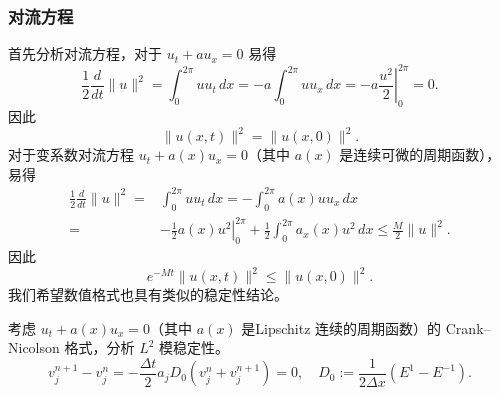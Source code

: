 \subsubsection{对流方程}

首先分析对流方程，对于 $u_t + a u_x = 0$ 易得
\[
    \frac12 \frac{d}{dt} \|u\|^2 = \int_{0}^{2\pi} u u_t \,dx = - a \int_0^{2\pi} u u_x\,dx
    = - a \left. \frac{u^2}2 \right|_0^{2\pi} = 0.
\]
因此
\[
    \| u(x,t) \|^2 = \| u(x,0) \|^2.
\]
对于变系数对流方程 $u_t + a(x) u_x = 0$（其中 $a(x)$ 是连续可微的周期函数），易得
\begin{align*}
    \frac12 \frac{d}{dt} \|u\|^2 ={} & \int_{0}^{2\pi} u u_t \,dx = - \int_0^{2\pi} a(x) u u_x\,dx                         \\
    ={}                              & - \frac12 \left. a(x) u^2 \right|_0^{2\pi} + \frac12\int_{0}^{2\pi} a_x(x) u^2 \,dx
    \le{}  \frac{M}2 \| u \|^2.
\end{align*}
因此
\[
    e^{- M t} \| u(x,t) \|^2 \le \| u(x,0) \|^2.
\]
我们希望数值格式也具有类似的稳定性结论。

\begin{example}
    考虑 $u_t + a(x) u_x = 0$（其中 $a(x)$ 是Lipschitz 连续的周期函数）的 Crank–Nicolson 格式，分析 $L^2$ 模稳定性。
    \[
        v_j^{n+1}-v_j^n = - \frac{\Delta t}{2} a_j D_0(v_j^n + v_j^{n+1}) = 0,\quad
        D_0 := \frac1{2\Delta x}(E^1-E^{-1}).
    \]
\end{example}

